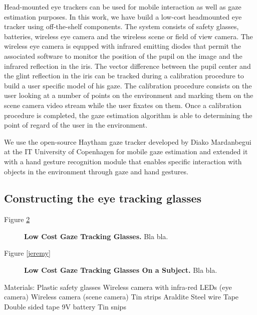 \documentclass[jou,a4paper,notxfonts]{apa}
\begin{document}
Head-mounted eye trackers can be used for mobile interaction as well as gaze estimation purposes.
In this work, we have build a low-cost headmounted eye tracker using off-the-shelf components.  The system consists of
safety glasses, batteries, wireless eye camera and the wireless scene or field of view camera. The wireless eye camera
is equpped with infrared emitting diodes that permit the associated software to monitor the position of the pupil on the
image and the infrared reflection in the iris. The vector difference between the pupil center and the glint reflection
in the iris can be tracked during a calibration procedure to build a user specific model of his gaze. The calibration
procedure consists on the user looking at a number of points on the environment and marking them on the scene camera
video stream while the user fixates on them.  Once a calibration procedure is completed, the gaze estimation algorithm
is able to determining the point of regard of the user in the environment.


We use the open-source Haytham \cite{Mardanbegi2011} gaze tracker developed by Diako Mardanbegui at the IT University of
Copenhagen for mobile gaze estimation and extended it with a hand gesture recognition module that enables specific
interaction with objects in the environment through gaze and hand gestures.

\subsection{Constructing the eye tracking glasses}

Figure \ref{gazeTrackingGlasses}

\begin{figure}[tp]
 \caption{\textbf{Low Cost Gaze Tracking Glasses.} Bla bla.}
 \label{gazeTrackingGlasses}
\end{figure}


Figure \ref{jeremy}

\begin{figure}[tp]
 \caption{\textbf{Low Cost Gaze Tracking Glasses On a Subject.} Bla bla.}
 \label{gazeTrackingGlasses}
\end{figure}


Materials:
Plastic safety glasses
Wireless camera with infra-red LEDs (eye camera)
Wireless camera	(scene camera)
Tin strips
Araldite
Steel wire
Tape
Double sided tape
9V battery
Tin snips
\end{document}
